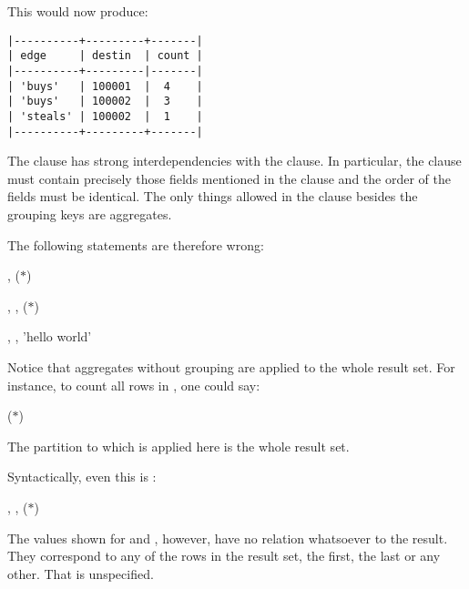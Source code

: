 This would now produce:

\begin{minipage}{\textwidth}
\begin{verbatim}
|----------+---------+-------|
| edge     | destin  | count |
|----------+---------|-------|
| 'buys'   | 100001  |  4    |
| 'buys'   | 100002  |  3    |
| 'steals' | 100002  |  1    |
|----------+---------+-------|
\end{verbatim}
\end{minipage}

The  clause has strong interdependencies
with the  clause.
In particular, the  clause must
contain precisely those fields mentioned in the
 clause and the order of the fields
must be identical. The only things allowed in
the  clause besides the grouping keys
are aggregates.

The following statements are therefore wrong:

 , 
                 ($\ast$)
 
 

 ,
                 , 
                 ($\ast$)
 
 

 , 
                 ,
                 'hello world'
 
 

Notice that aggregates without grouping
are applied to the whole result set.
For instance, to count all rows in ,
one could say:

 ($\ast$)
 

The partition to which  is applied here
is the whole result set.

Syntactically, even this is :

 ,
                 ,
                 ($\ast$)
 

The values shown for  and ,
however, have no relation whatsoever to the 
result. They correspond
to any of the rows in the result set,
the first, the last or any other.
That is unspecified.

